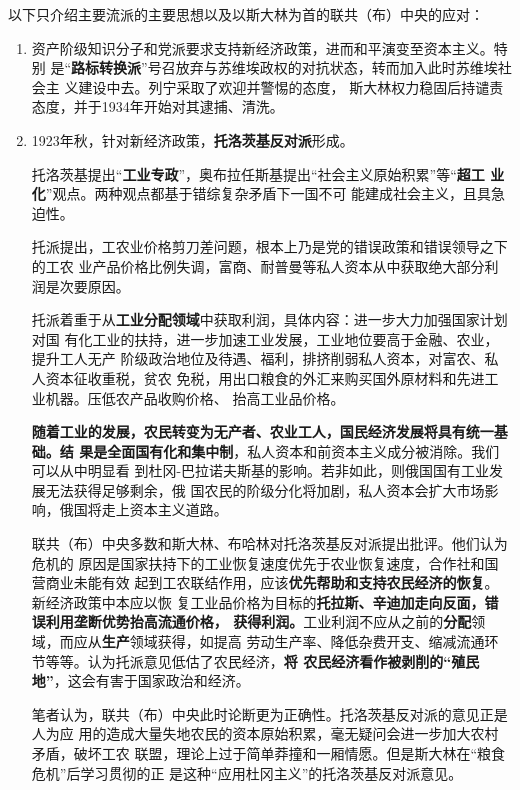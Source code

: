 以下只介绍主要流派的主要思想以及以斯大林为首的联共（布）中央的应对：
\begin{enumerate}
\item 资产阶级知识分子和党派要求支持新经济政策，进而和平演变至资本主义。特别
  是“\textbf{路标转换派}”号召放弃与苏维埃政权的对抗状态，转而加入此时苏维埃社会主
  义建设中去。列宁采取了欢迎并警惕的态度\cite[2.1节]{yanyongfeinep}，
  斯大林权力稳固后持谴责态度，并于1934年开始对其逮捕、清洗。\cite{wenyilubiao}

\item 1923年秋，针对新经济政策，\textbf{托洛茨基反对派}形成。

  托洛茨基提出“\textbf{工业专政}”，奥布拉任斯基提出“社会主义原始积累”等“\textbf{超工
    业化}”观点\cite[2.2节]{yanyongfeinep}。两种观点都基于错综复杂矛盾下一国不可
  能建成社会主义，且具急迫性。

  托派提出，工农业价格剪刀差问题，根本上乃是党的错误政策和错误领导之下的工农
  业产品价格比例失调，富商、耐普曼等私人资本从中获取绝大部分利润是次要原因。

  托派着重于从\textbf{工业分配领域}中获取利润，具体内容：进一步大力加强国家计划对国
  有化工业的扶持，进一步加速工业发展，工业地位要高于金融、农业，提升工人无产
  阶级政治地位及待遇、福利，排挤削弱私人资本，对富农、私人资本征收重税，贫农
  免税，用出口粮食的外汇来购买国外原材料和先进工业机器。压低农产品收购价格、
  抬高工业品价格。

  \textbf{随着工业的发展，农民转变为无产者、农业工人，国民经济发展将具有统一基础。结
  果是全面国有化和集中制}，私人资本和前资本主义成分被消除。我们可以从中明显看
  到杜冈-巴拉诺夫斯基的影响。若非如此，则俄国国有工业发展无法获得足够剩余，俄
  国农民的阶级分化将加剧，私人资本会扩大市场影响，俄国将走上资本主义道路。

  联共（布）中央多数和斯大林、布哈林对托洛茨基反对派提出批评。他们认为危机的
  原因是国家扶持下的工业恢复速度优先于农业恢复速度，合作社和国营商业未能有效
  起到工农联结作用，应该\textbf{优先帮助和支持农民经济的恢复}。新经济政策中本应以恢
  复工业品价格为目标的\textbf{托拉斯、辛迪加走向反面，错误利用垄断优势抬高流通价格，
    获得利润。}工业利润不应从之前的\textbf{分配}领域，而应从\textbf{生产}领域获得，如提高
  劳动生产率、降低杂费开支、缩减流通环节等等。认为托派意见低估了农民经济，\textbf{将
    农民经济看作被剥削的“殖民地”}，这会有害于国家政治和经济。

  笔者认为，联共（布）中央此时论断更为正确性。托洛茨基反对派的意见正是人为应
  用的造成大量失地农民的资本原始积累，毫无疑问会进一步加大农村矛盾，破坏工农
  联盟，理论上过于简单莽撞和一厢情愿。但是斯大林在“粮食危机”后学习贯彻的正
  是这种“应用杜冈主义”的托洛茨基反对派意见。


\end{enumerate}

